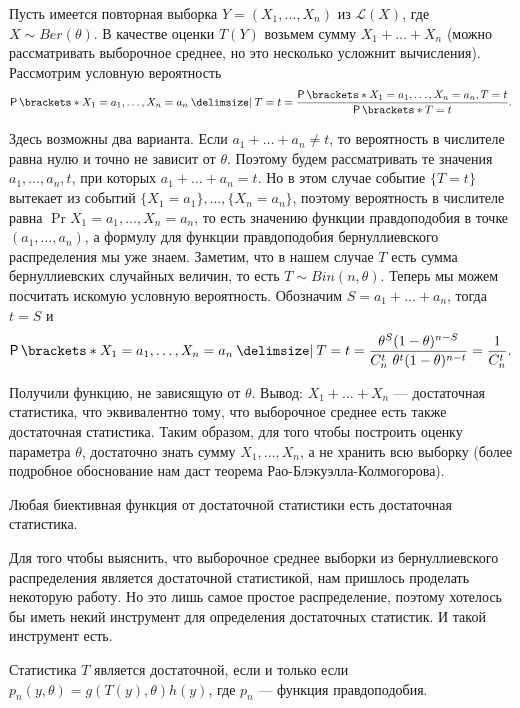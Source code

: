 \begin{example}
    Пусть имеется повторная выборка $Y = (X_1, \ldots, X_n)$ из $\mathcal{L}(X)$, где $X \sim Ber(\theta)$. В качестве оценки $T(Y)$ возьмем сумму $X_1 + \ldots + X_n$ (можно рассматривать выборочное среднее, но это несколько усложнит вычисления). Рассмотрим условную вероятность
    \[
        \Pr{X_1 = a_1, \ldots, X_n = a_n \given T = t} = \frac{\Pr{X_1 = a_1, \ldots, X_n = a_n, T = t}}{\Pr{T = t}}.
    \]

    Здесь возможны два варианта. Если $a_1 + \ldots + a_n \neq t$, то вероятность в числителе равна нулю и точно не зависит от $\theta$. Поэтому будем рассматривать те значения $a_1, \ldots, a_n, t$, при которых $a_1 + \ldots + a_n = t$. Но в этом случае событие $\{T = t\}$ вытекает из событий $\{X_1 = a_1\}, \ldots, \{X_n = a_n\}$, поэтому вероятность в числителе равна $\Pr{X_1 = a_1, \ldots, X_n = a_n}$, то есть значению функции правдоподобия в точке $(a_1, \ldots, a_n)$, а формулу для функции правдоподобия бернуллиевского распределения мы уже знаем. Заметим, что в нашем случае $T$ есть сумма бернуллиевских случайных величин, то есть $T \sim Bin(n, \theta)$. Теперь мы можем посчитать искомую условную вероятность. Обозначим $S = a_1 + \ldots + a_n$, тогда $t = S$ и
    \[
        \Pr{X_1 = a_1, \ldots, X_n = a_n \given T = t} = \dfrac{\theta^S(1-\theta)^{n-S}}{C_n^t\  \theta^t (1-\theta)^{n-t}} = \dfrac{1}{C_n^t}.
    \]

    Получили функцию, не зависящую от $\theta$. Вывод: $X_1 + \ldots + X_n$ --- 
    достаточная статистика, что эквивалентно тому, что выборочное среднее есть 
    также достаточная статистика. Таким образом, для того чтобы построить 
    оценку параметра $\theta$, достаточно знать сумму $X_1, \ldots, X_n$, а не 
    хранить всю выборку (более подробное обоснование нам даст теорема 
    Рао-Блэкуэлла-Колмогорова).
\end{example}

\begin{remark}
    Любая биективная функция от достаточной статистики есть достаточная статистика.
\end{remark}

Для того чтобы выяснить, что выборочное среднее выборки из бернуллиевского распределения является достаточной статистикой, нам пришлось проделать некоторую работу. Но это лишь самое простое распределение, поэтому хотелось бы иметь некий инструмент для определения достаточных статистик. И такой инструмент есть.

\begin{theorem}
    Статистика $T$ является достаточной, если и только если $p_n(y, \theta) = g(T(y), \theta)h(y)$, где $p_n$ --- функция правдоподобия.
\end{theorem}

